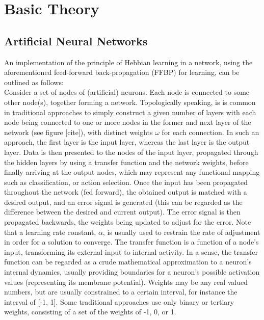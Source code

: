 
\chapter{Basic Theory}

\section{Artificial Neural Networks}

An implementation of the principle of Hebbian learning in a network, using the aforementioned feed-forward back-propagation (FFBP) for learning, can be outlined as follows:
\\
Consider a set of nodes of (artificial) neurons. Each node is connected to some other node(s), together forming a network. Topologically speaking, is is common in traditional approaches to simply construct a given number of layers with each node being connected to one or more nodes in the former and next layer of the network (see figure [cite]), with distinct weights $\omega$ for each connection. In such an approach, the first layer is the input layer, whereas the last layer is the output layer. Data is then presented to the nodes of the input layer, propagated through the hidden layers by using a transfer function and the network weights, before finally arriving at the output nodes, which may represent any functional mapping such as classification, or action selection. Once the input has been propagated throughout the network (fed forward), the obtained output is matched with a desired output, and an error signal is generated (this can be regarded as the difference between the desired and current output). The error signal is then propagated backwards, the weights being updated to adjust for the error. Note that a learning rate constant, $\alpha$, is usually used to restrain the rate of adjustment in order for a solution to converge.
The transfer function is a function of a node's input, transforming its external input to internal activity. In a sense, the transfer function can be regarded as a crude mathematical approximation to a neuron's internal dynamics, usually providing boundaries for a neuron's possible activation values (representing its membrane potential). Weights may be any real valued numbers, but are usually constrained to a certain interval, for instance the interval of [-1, 1]. Some traditional approaches use only binary or tertiary weights, consisting of a set of the weights of -1, 0, or 1.
\\
\\

